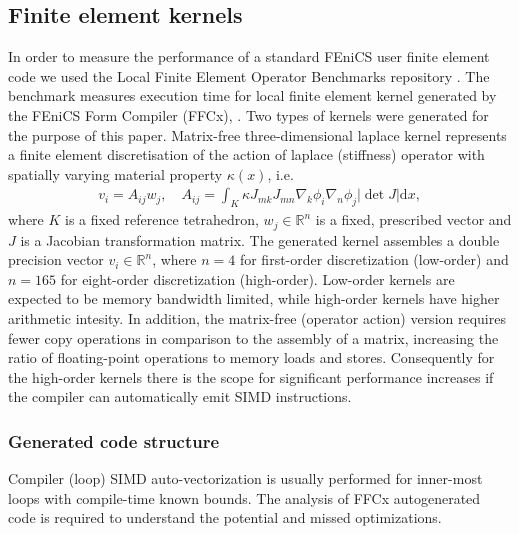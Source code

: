 \subsection*{Finite element kernels}

In order to measure the performance of a standard FEniCS user finite element
code we used the Local Finite Element Operator Benchmarks repository
\citep{Baratta2023}. The benchmark measures execution time for local finite
element kernel generated by the FEniCS Form Compiler (FFCx), \citep{baratta2023dolfinx}.
Two types of kernels were generated for the purpose of this paper. Matrix-free
three-dimensional laplace kernel represents a finite element discretisation of
the action of laplace (stiffness) operator with spatially varying material
property $\kappa(x)$, i.e.
\begin{align}
    v_i = A_{ij} w_j, \quad
    A_{ij} = \int_K \kappa J_{mk} J_{mn} \nabla_k \phi_i \nabla_n \phi_j |\det J| \mathrm dx,
\end{align}
where $K$ is a fixed reference tetrahedron, $w_j \in \mathbb{R}^{n}$ is a fixed,
prescribed vector and $J$ is a Jacobian transformation matrix. The generated
kernel assembles a double precision vector $v_i \in \mathbb{R}^{n}$, where $n =
4$ for first-order discretization (low-order) and $n = 165$ for eight-order
discretization (high-order). Low-order kernels are expected to be memory
bandwidth limited, while high-order kernels have higher arithmetic intesity. In
addition, the matrix-free (operator action) version requires fewer copy
operations in comparison to the assembly of a matrix, increasing the ratio of
floating-point operations to memory loads and stores. Consequently for the
high-order kernels there is the scope for significant performance increases if
the compiler can automatically emit SIMD instructions.

\subsubsection*{Generated code structure}

Compiler (loop) SIMD auto-vectorization is usually performed for inner-most loops
with compile-time known bounds. The analysis of FFCx autogenerated code is
required to understand the potential and missed optimizations.

